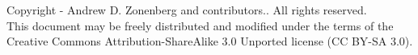 Copyright -\the\year{} Andrew D. Zonenberg and contributors.. All rights reserved. \\

This document may be freely distributed and modified under the terms of the Creative Commons Attribution-ShareAlike 3.0
Unported license (CC BY-SA 3.0).

